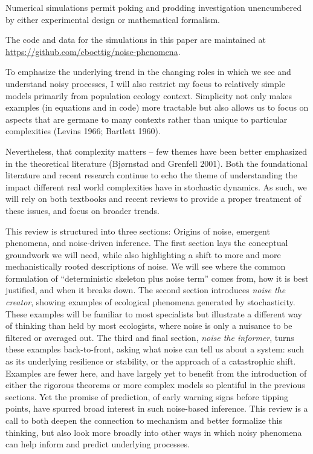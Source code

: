 \documentclass[3p]{elsarticle} %
\begin{document}
Numerical simulations permit poking and prodding investigation
unencumbered by either experimental design or mathematical formalism.

The code and data for the simulations in this paper are maintained at
\url{https://github.com/cboettig/noise-phenomena}.

To emphasize the underlying trend in the changing roles in which we see
and understand noisy processes, I will also restrict my focus to
relatively simple models primarily from population ecology context.
Simplicity not only makes examples (in equations and in code) more
tractable but also allows us to focus on aspects that are germane to
many contexts rather than unique to particular complexities (Levins
1966; Bartlett 1960).

Nevertheless, that complexity matters -- few themes have been better
emphasized in the theoretical literature (Bjørnstad and Grenfell 2001).
Both the foundational literature and recent research continue to echo
the theme of understanding the impact different real world complexities
have in stochastic dynamics. As such, we will rely on both textbooks and
recent reviews to provide a proper treatment of these issues, and focus
on broader trends.

This review is structured into three sections: Origins of noise,
emergent phenomena, and noise-driven inference. The first section lays
the conceptual groundwork we will need, while also highlighting a shift
to more and more mechanistically rooted descriptions of noise. We will
see where the common formulation of ``deterministic skeleton plus noise
term'' comes from, how it is best justified, and when it breaks down.
The second section introduces \emph{noise the creator}, showing examples
of ecological phenomena generated by stochasticity. These examples will
be familiar to most specialists but illustrate a different way of
thinking than held by most ecologists, where noise is only a nuisance to
be filtered or averaged out. The third and final section, \emph{noise
the informer}, turns these examples back-to-front, asking what noise can
tell us about a system: such as its underlying resilience or stability,
or the approach of a catastrophic shift. Examples are fewer here, and
have largely yet to benefit from the introduction of either the rigorous
theorems or more complex models so plentiful in the previous sections.
Yet the promise of prediction, of early warning signs before tipping
points, have spurred broad interest in such noise-based inference. This
review is a call to both deepen the connection to mechanism and better
formalize this thinking, but also look more broadly into other ways in
which noisy phenomena can help inform and predict underlying processes.
\end{document}
